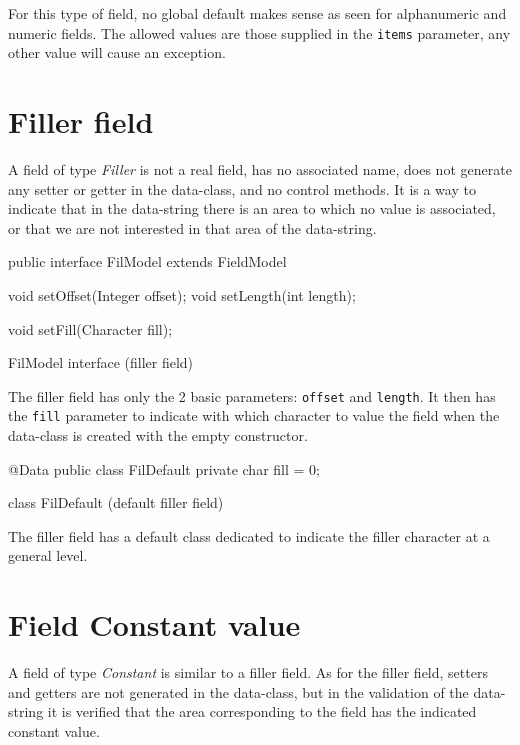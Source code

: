 \documentclass[a4paper,10pt]{report}
\newenvironment{elisting}[1][H]
  {\captionsetup{aboveskip=0pt}\begin{listing}[#1]}
  {\end{listing}%
}
\begin{document}
For this type of field, no global default makes sense as seen for alphanumeric 
and numeric fields. The allowed values are those supplied in the \verb!items! 
parameter, any other value will cause an exception.

\section{Filler field}
A field of type \textsl{Filler} is not a real field, has no associated name, 
does not generate any setter or getter in the data-class, and no control 
methods. It is a way to indicate that in the data-string there is an area to 
which no value is associated, or that we are not interested in that area of 
the data-string.

\begin{elisting}[!htb]
\begin{javacode}
public interface FilModel extends FieldModel {
    void setOffset(Integer offset);
    void setLength(int length);
    
    void setFill(Character fill);
}
\end{javacode}
\caption{FilModel interface (filler field)}
\label{lst:FilModel}
\end{elisting}

The filler field has only the 2 basic parameters: \verb!offset! and 
\verb!length!. It then has the \verb!fill! parameter to indicate with which 
character to value the field when the data-class is created with the empty 
constructor.

\begin{elisting}[!htb]
\begin{javacode}
@Data
public class FilDefault {
    private char fill = 0;
}
\end{javacode}
\caption{class FilDefault (default filler field)}
\label{lst:FilDefault}
\end{elisting}

The filler field has a default class dedicated to indicate the filler character 
at a general level.

\section{Field Constant value}
A field of type \textsl{Constant} is similar to a filler field. As for the 
filler field, setters and getters are not generated in the data-class, but in 
the validation of the data-string it is verified that the area corresponding to 
the field has the indicated constant value.
\end{document}

